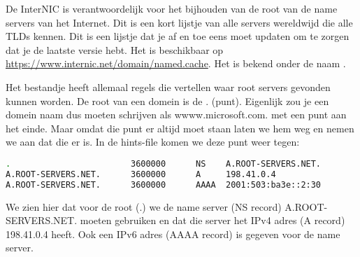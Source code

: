 De InterNIC is verantwoordelijk voor het bijhouden van de root van de name servers van het Internet. Dit is een kort lijstje van alle servers wereldwijd die alle TLDs kennen. Dit is een lijstje dat je af en toe eens moet updaten om te zorgen dat je de laatste versie hebt. Het is beschikbaar op \url{https://www.internic.net/domain/named.cache}. Het is bekend onder de naam .

Het bestandje heeft allemaal regels die vertellen waar root servers gevonden kunnen worden. De root van een domein is de . (punt). Eigenlijk zou je een domein naam dus moeten schrijven als wwww.microsoft.com. met een punt aan het einde. Maar omdat die punt er altijd moet staan laten we hem weg en nemen we aan dat die er is. In de hints-file komen we deze punt weer tegen:
\begin{lstlisting}[language=bash]
.                        3600000      NS    A.ROOT-SERVERS.NET.
A.ROOT-SERVERS.NET.      3600000      A     198.41.0.4
A.ROOT-SERVERS.NET.      3600000      AAAA  2001:503:ba3e::2:30
\end{lstlisting}
We zien hier dat voor de root (.) we de name server (NS record) A.ROOT-SERVERS.NET. moeten gebruiken en dat die server het IPv4 adres (A record) 198.41.0.4 heeft. Ook een IPv6 adres (AAAA record) is gegeven voor de name server.

